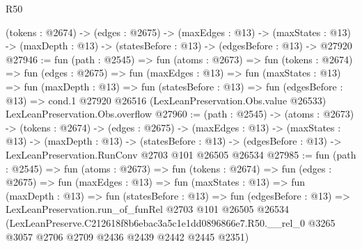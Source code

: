 \begin{lexlean}{R50}
\begin{coremodule}
  (tokens : @2674) ->
  (edges : @2675) ->
  (maxEdges : @13) ->
  (maxStates : @13) -> (maxDepth : @13) -> (statesBefore : @13) -> (edgesBefore : @13) -> @27920
@27946 := fun (path : @2545) =>
  fun (atoms : @2673) =>
  fun (tokens : @2674) =>
  fun (edges : @2675) =>
  fun (maxEdges : @13) =>
  fun (maxStates : @13) =>
  fun (maxDepth : @13) =>
  fun (statesBefore : @13) =>
  fun (edgesBefore : @13) =>
  cond.{1} @27920 @26516 (LexLeanPreservation.Obs.value @26533) LexLeanPreservation.Obs.overflow
@27960 := (path : @2545) ->
  (atoms : @2673) ->
  (tokens : @2674) ->
  (edges : @2675) ->
  (maxEdges : @13) ->
  (maxStates : @13) ->
  (maxDepth : @13) ->
  (statesBefore : @13) ->
  (edgesBefore : @13) -> LexLeanPreservation.RunConv @2703 @101 @26505 @26534
@27985 := fun (path : @2545) =>
  fun (atoms : @2673) =>
  fun (tokens : @2674) =>
  fun (edges : @2675) =>
  fun (maxEdges : @13) =>
  fun (maxStates : @13) =>
  fun (maxDepth : @13) =>
  fun (statesBefore : @13) =>
  fun (edgesBefore : @13) =>
  LexLeanPreservation.run_of_funRel
    @2703
    @101
    @26505
    @26534
    (LexLeanPreserve.C212618f8b6ebac3a5c1e1dd0896866e7.R50.__rel_0
      @3265
      @3057
      @2706
      @2709
      @2436
      @2439
      @2442
      @2445
      @2351)
\end{coremodule}
\end{lexlean}
